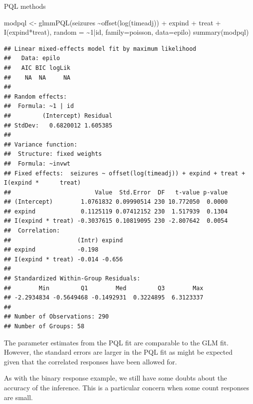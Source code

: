 \documentclass[
  ignorenonframetext,
]{beamer}
\newenvironment{Shaded}{\begin{snugshade}}{\end{snugshade}}
\newcommand{\AttributeTok}[1]{\textcolor[rgb]{0.77,0.63,0.00}{#1}}
\newcommand{\DecValTok}[1]{\textcolor[rgb]{0.00,0.00,0.81}{#1}}
\newcommand{\FunctionTok}[1]{\textcolor[rgb]{0.00,0.00,0.00}{#1}}
\newcommand{\NormalTok}[1]{#1}
\newcommand{\OtherTok}[1]{\textcolor[rgb]{0.56,0.35,0.01}{#1}}
\newcommand{\SpecialCharTok}[1]{\textcolor[rgb]{0.00,0.00,0.00}{#1}}
\begin{document}
\begin{frame}[fragile]{PQL methods}
\protect\hypertarget{pql-methods}{}
\tiny

\begin{Shaded}
\begin{Highlighting}[]
\NormalTok{modpql }\OtherTok{\textless{}{-}} \FunctionTok{glmmPQL}\NormalTok{(seizures }\SpecialCharTok{\textasciitilde{}}\FunctionTok{offset}\NormalTok{(}\FunctionTok{log}\NormalTok{(timeadj)) }\SpecialCharTok{+}\NormalTok{ expind }\SpecialCharTok{+}\NormalTok{ treat }\SpecialCharTok{+} 
  \FunctionTok{I}\NormalTok{(expind}\SpecialCharTok{*}\NormalTok{treat), }\AttributeTok{random =} \SpecialCharTok{\textasciitilde{}}\DecValTok{1}\SpecialCharTok{|}\NormalTok{id, }\AttributeTok{family=}\NormalTok{poisson, }\AttributeTok{data=}\NormalTok{epilo)}
\FunctionTok{summary}\NormalTok{(modpql)}
\end{Highlighting}
\end{Shaded}

\begin{verbatim}
## Linear mixed-effects model fit by maximum likelihood
##   Data: epilo 
##   AIC BIC logLik
##    NA  NA     NA
## 
## Random effects:
##  Formula: ~1 | id
##         (Intercept) Residual
## StdDev:   0.6820012 1.605385
## 
## Variance function:
##  Structure: fixed weights
##  Formula: ~invwt 
## Fixed effects:  seizures ~ offset(log(timeadj)) + expind + treat + I(expind *      treat) 
##                        Value  Std.Error  DF   t-value p-value
## (Intercept)        1.0761832 0.09990514 230 10.772050  0.0000
## expind             0.1125119 0.07412152 230  1.517939  0.1304
## I(expind * treat) -0.3037615 0.10819095 230 -2.807642  0.0054
##  Correlation: 
##                   (Intr) expind
## expind            -0.198       
## I(expind * treat) -0.014 -0.656
## 
## Standardized Within-Group Residuals:
##        Min         Q1        Med         Q3        Max 
## -2.2934834 -0.5649468 -0.1492931  0.3224895  6.3123337 
## 
## Number of Observations: 290
## Number of Groups: 58
\end{verbatim}
\end{frame}

\begin{frame}{}
\protect\hypertarget{section-9}{}
The parameter estimates from the PQL fit are comparable to the GLM fit.
However, the standard errors are larger in the PQL fit as might be
expected given that the correlated responses have been allowed for.

As with the binary response example, we still have some doubts about the
accuracy of the inference. This is a particular concern when some count
responses are small.
\end{frame}
\end{document}
